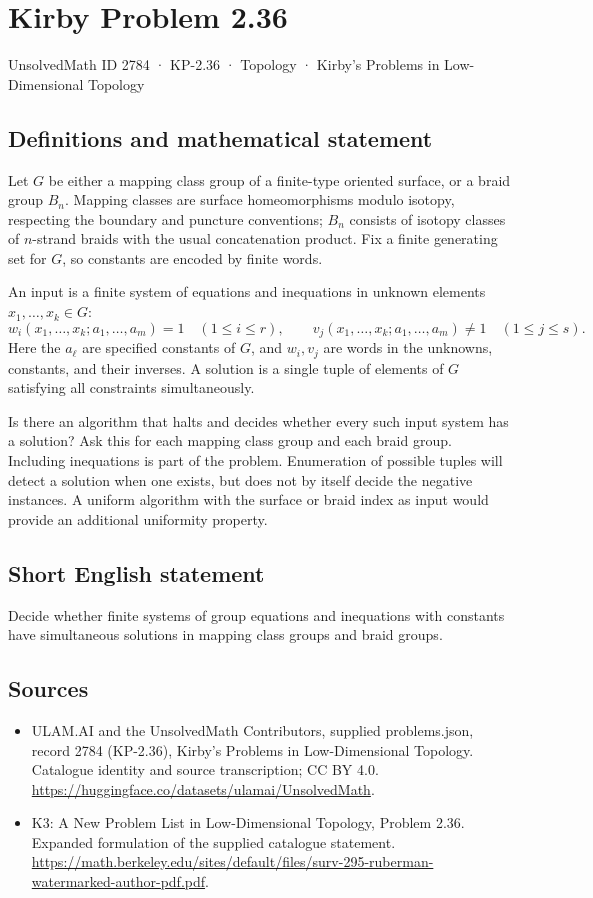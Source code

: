 \documentclass[11pt,a4paper]{article}
\begin{document}
\section*{Kirby Problem 2.36}\label{2784}
{\small UnsolvedMath ID 2784 · KP-2.36 · Topology · Kirby's Problems in Low-Dimensional Topology}
\subsection{Definitions and mathematical statement}
Let $G$ be either a mapping class group of a finite-type oriented surface,
or a braid group $B_n$. Mapping classes are surface homeomorphisms modulo
isotopy, respecting the boundary and puncture conventions; $B_n$ consists of
isotopy classes of $n$-strand braids with the usual concatenation product.
Fix a finite generating set for $G$, so constants are encoded by finite words.

An input is a finite system of equations and inequations in unknown elements
$x_1,\ldots,x_k\in G$:
\[
 w_i(x_1,\ldots,x_k;a_1,\ldots,a_m)=1\quad(1\leq i\leq r),
 \qquad
 v_j(x_1,\ldots,x_k;a_1,\ldots,a_m)\ne1\quad(1\leq j\leq s).
\]
Here the $a_\ell$ are specified constants of $G$, and $w_i,v_j$ are words
in the unknowns, constants, and their inverses. A solution is a single tuple
of elements of $G$ satisfying all constraints simultaneously.

Is there an algorithm that halts and decides whether every such input system
has a solution? Ask this for each mapping class group and each braid group.
Including inequations is part of the problem. Enumeration of possible tuples
will detect a solution when one exists, but does not by itself decide the
negative instances. A uniform algorithm with the surface or braid index as
input would provide an additional uniformity property.
\subsection{Short English statement}
Decide whether finite systems of group equations and inequations with constants have simultaneous solutions in mapping class groups and braid groups.
\subsection{Sources}
\begin{itemize}
\item[S1] ULAM.AI and the UnsolvedMath Contributors, supplied problems.json, record 2784 (KP-2.36), Kirby's Problems in Low-Dimensional Topology. Catalogue identity and source transcription; CC BY 4.0.
\url{https://huggingface.co/datasets/ulamai/UnsolvedMath}.
\item[S2] K3: A New Problem List in Low-Dimensional Topology, Problem 2.36. Expanded formulation of the supplied catalogue statement.
\url{https://math.berkeley.edu/sites/default/files/surv-295-ruberman-watermarked-author-pdf.pdf}.
\end{itemize}
\end{document}
